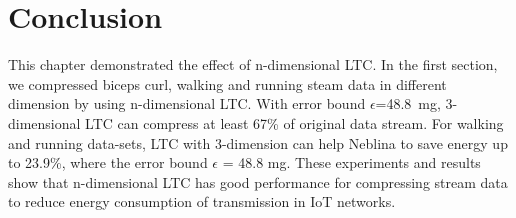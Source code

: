 \section{Conclusion}
This chapter demonstrated the effect of n-dimensional LTC. In the first section,
we compressed biceps curl, walking and running steam data in different dimension
by using n-dimensional LTC. With error bound $\epsilon$=48.8\ mg, 3-dimensional
LTC can compress at least 67\% of original data stream. For walking and running
data-sets, LTC with 3-dimension can help Neblina to save energy up to 23.9\%,
where the error bound $\epsilon$ = 48.8 mg. These experiments and results
show that n-dimensional LTC has good performance for compressing stream data
to reduce energy consumption of transmission in IoT networks.
